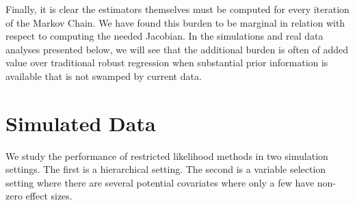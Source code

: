 \documentclass[ba]{imsart}
\newcommand{\response}[1]{{\color{blue}#1}}
\begin{document}
\response{Finally, it is clear the estimators themselves must be computed for every iteration of the Markov Chain. We have found this burden to be marginal in relation with respect to computing the needed Jacobian. In the simulations and real data analyses presented below, we will see that the additional burden is often of added value over traditional robust regression when substantial prior information is available that is not swamped by current data.}

%
%

\section{Simulated Data}
\label{simData}
We study the performance of restricted likelihood methods in two simulation settings. The first is a hierarchical setting. The second is a variable selection setting where there are several potential covariates where only a few have non-zero effect sizes.
\end{document}
